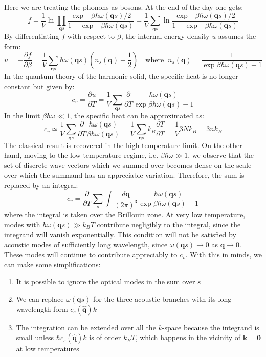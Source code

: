 \documentclass[10.75pt,a4paper,openright,bottom=2cm]{article}
\renewcommand{\Vec}[1]{\boldsymbol{#1}}
\begin{document}
Here we are treating the phonons as bosons. At the end of the day one gets:
\[
f=\frac{1}{V}\ln{\prod_{\Vec{q}s}\frac{\exp{-\beta\hbar\omega(\Vec{q}s)/2}}{1-\exp{-\beta\hbar\omega(\Vec{q}s)}}}=\frac{1}{V}\sum_{\Vec{q}s}\ln{\frac{\exp{-\beta\hbar\omega(\Vec{q}s)/2}}{1-\exp{-\beta\hbar\omega(\Vec{q}s)}}}
\]
By differentiating $f$ with respect to $\beta$, the internal energy density $u$ assumes the form:
\[
u=-\frac{\partial f}{\partial\beta}=\frac{1}{V}\sum_{\Vec{q}s}\hbar\omega(\Vec{q}s)\left(n_s(\Vec{q})+\frac{1}{2}\right) \quad \text{where}\;\; n_s(\Vec{q})=\frac{1}{\exp{\beta\hbar\omega(\Vec{q}s)}-1}
\]
In the quantum theory of the harmonic solid, the specific heat is no longer constant but given by:
\[
c_v=\frac{\partial u}{\partial T}=\frac{1}{V}\sum_{\Vec{q}s}\frac{\partial}{\partial T}\frac{\hbar\omega(\Vec{q}s)}{\exp{\beta\hbar\omega(\Vec{q}s)}-1}
\]
In the limit $\beta\hbar\omega\ll1$, the specific heat can be approximated as:
\[
c_v\simeq\frac{1}{V}\sum_{\Vec{q}s}\frac{\partial}{\partial T}\frac{\hbar\omega(\Vec{q}s)}{\beta\hbar\omega(\Vec{q}s)}=\frac{1}{V}\sum_{\Vec{q}s}k_B\frac{\partial T}{\partial T}=\frac{1}{V}3Nk_B=3nk_B
\]
The classical result is recovered in the high-temperature limit. On the other hand, moving to the low-temperature regime, i.e. $\beta\hbar\omega\gg1$, we observe that the set of discrete wave vectors which we summed over becomes dense on the scale over which the summand has an appreciable variation. Therefore, the sum is replaced by an integral:
\begin{equation}
\label{general}
c_v=\frac{\partial}{\partial T}\sum_s\int\frac{d\Vec{q}}{(2\pi)^3}\frac{\hbar\omega(\Vec{q}s)}{\exp{\beta\hbar\omega(\Vec{q}s)}-1}
\end{equation}
where the integral is taken over the  Brillouin zone. At very low temperature, modes with $\hbar\omega(\Vec{q}s)\gg k_BT$ contribute negligibly to the integral, since the integrand will vanish exponentially. This condition will not be satisfied by acoustic modes of sufficiently long wavelength, since $\omega(\Vec{q}s)\to0$ as $\Vec{q}\to0$. These modes will continue to contribute appreciably to $c_v$. With this in minds, we can make some simplifications:
\begin{enumerate}
    \item It is possible to ignore the optical modes in the sum over $s$
    \item We can replace $\omega(\Vec{q}s)$ for the three acoustic branches with its long wavelength form $c_s(\hat{\Vec{q}})k$
    \item The integration can be extended over all the $k$-space because the integrand is small unless $\hbar c_s(\hat{\Vec{q}})k$ is of order $k_BT$, which happens in the vicinity of $\Vec{k}=\Vec{0}$ at low temperatures
\end{enumerate}
\end{document}
